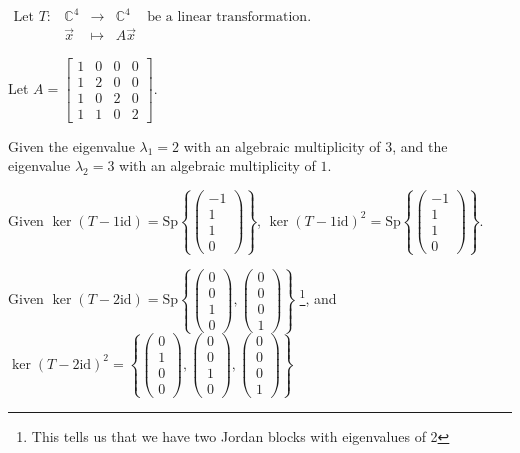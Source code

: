 \documentclass[11pt,fleqn]{book} %
\begin{document}
\begin{example}
{~~~}
    
    $\begin{matrix} \text{Let } T: &\mathbb{C}^4 &\to &\mathbb{C}^4 &\text{be a linear transformation. } \\ &\vec{x} &\mapsto &A\vec{x}  \end{matrix}$
        
    Let $A = \begin{bmatrix} 1 &0 &0 &0 \\ 1 &2 &0 &0 \\ 1 &0 &2 &0 \\ 1 &1 &0 &2 \end{bmatrix}$. 
        
    Given the eigenvalue $\lambda_1 = 2$ with an algebraic multiplicity of $3$, and the eigenvalue $\lambda_2 = 3$ with an algebraic multiplicity of $1$. 
        
    Given $\ker(T - 1\mathrm{id}) = \mathrm{Sp}\left\{\begin{pmatrix} -1 \\ 1 \\ 1 \\ 0 \end{pmatrix}\right\}$, $\ker(T - 1\mathrm{id})^2 = \mathrm{Sp}\left\{\begin{pmatrix} -1 \\ 1 \\ 1 \\ 0 \end{pmatrix}\right\}$. 
        
    Given $\ker(T - 2\mathrm{id}) = \mathrm{Sp}\left\{\begin{pmatrix} 0 \\ 0 \\ 1 \\ 0 \end{pmatrix}, \begin{pmatrix} 0 \\ 0 \\ 0 \\ 1 \end{pmatrix}\right\}$ \footnote{This tells us that we have two Jordan blocks with eigenvalues of 2}, and $\ker (T - 2\mathrm{id})^2 = \left\{\begin{pmatrix} 0\\1\\0\\0 \end{pmatrix}, \begin{pmatrix}0\\0\\1\\0 \end{pmatrix}, \begin{pmatrix} 0\\0\\0\\1 \end{pmatrix}\right\}$
        

\end{example}
\end{document}
